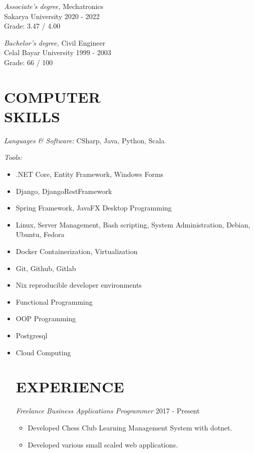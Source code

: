 \documentclass[line,margin]{res}
\begin{document}
\begin{resume}
                {\sl Associate's degree,} Mechatronics \\
                Sakarya University 
                2020 - 2022 \\
                Grade: 3.47 / 4.00 

                {\sl Bachelor's degree,} Civil Engineer \\
                Celal Bayar University 
                1999 - 2003 \\
                Grade: 66 / 100 
 
\section{COMPUTER \\ SKILLS} {\sl Languages \& Software:} CSharp, Java, Python, 
                Scala
                
                {\sl Tools:} 
                 \begin{itemize}  \itemsep -2pt %
                   \item .NET Core, Entity Framework, Windows Forms
                   \item Django, DjangoRestFramework
                   \item Spring Framework, JavaFX Desktop Programming
                   \item Linux, Server Management, Bash scripting, System Administration, Debian, Ubuntu, Fedora
                   \item Docker Containerization, Virtualization
                   \item Git, Github, Gitlab
                   \item Nix reproducible developer environments
                   \item Functional Programming 
                   \item OOP Programming 
                   \item Postgresql 
                   \item Cloud Computing 
 
\section{EXPERIENCE} {\sl Freelance Business Applications Programmer} \hfill  2017 - Present \\
                 \begin{itemize}  \itemsep -2pt %
                 \item Developed Chess Club Learning Management System with dotnet.
                \item   Developed various small scaled web applications.
                \end{itemize}
 

\end{itemize}
\end{resume}
\end{document}
